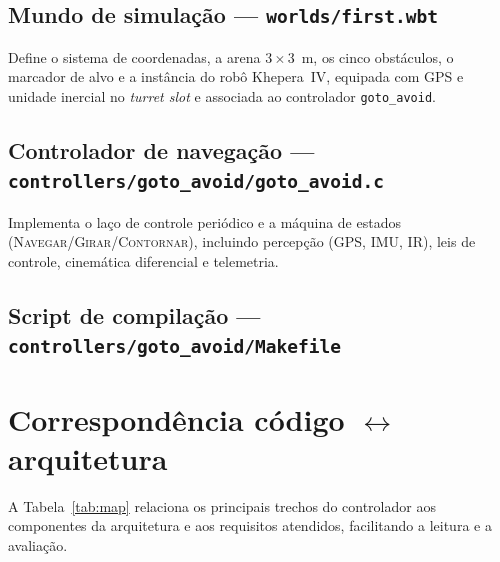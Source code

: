 \subsection{Mundo de simulação --- \texttt{worlds/first.wbt}}
Define o sistema de coordenadas, a arena $3\times3$~m, os cinco obstáculos, o marcador de alvo e a instância do robô Khepera~IV, equipada com GPS e unidade inercial no \emph{turret slot} e associada ao controlador \texttt{goto\_avoid}.



\subsection{Controlador de navegação --- \texttt{controllers/goto\_avoid/goto\_avoid.c}}
Implementa o laço de controle periódico e a máquina de estados (\textsc{Navegar}/\textsc{Girar}/\textsc{Contornar}), incluindo percepção (GPS, IMU, IR), leis de controle, cinemática diferencial e telemetria.



\subsection{Script de compilação --- \texttt{controllers/goto\_avoid/Makefile}}


\section{Correspondência código $\leftrightarrow$ arquitetura}
A Tabela~\ref{tab:map} relaciona os principais trechos do controlador aos componentes da arquitetura e aos requisitos atendidos, facilitando a leitura e a avaliação.

